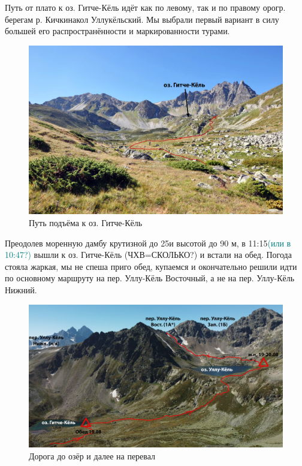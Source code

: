Путь от плато к оз. Гитче-Кёль идёт как по левому, так и по правому орогр. берегам р. Кичкинакол Уллукёльский. Мы выбрали первый вариант в силу большей его распространённости и маркированности турами. 

\begin{figure}[h!]
	\centering
	\includegraphics[width=0.7\linewidth]{../pics/DSC_0718}
	\caption{Путь подъёма к оз. Гитче-Кёль}
	\label{fig:DSC_0718}
\end{figure}

Преодолев моренную дамбу крутизной до 25\degree и высотой до 90 м, в 11:15\textcolor{teal}{(или в 10:47?)} вышли к оз. Гитче-Кёль (ЧХВ=\alert{СКОЛЬКО?}) и встали на обед. 
Погода стояла жаркая, мы не спеша приго обед, купаемся и окончательно решили идти по основному маршруту на пер. Уллу-Кёль Восточный, а не на пер. Уллу-Кёль Нижний.



\begin{figure}[h!]
	\centering
	\includegraphics[width=0.7\linewidth]{../pics/ullu_kuel_route}
	\caption{Дорога до озёр и далее на перевал}
	\label{fig:ullu_kuel_route}
\end{figure}

